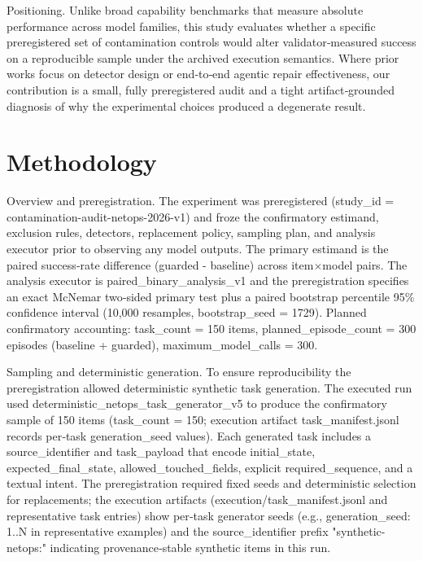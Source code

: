 \documentclass[conference]{IEEEtran}
\begin{document}
Positioning. Unlike broad capability benchmarks that measure absolute performance across model families, this study evaluates whether a specific preregistered set of contamination controls would alter validator‑measured success on a reproducible sample under the archived execution semantics. Where prior works focus on detector design or end‑to‑end agentic repair effectiveness, our contribution is a small, fully preregistered audit and a tight artifact‑grounded diagnosis of why the experimental choices produced a degenerate result.

\section{Methodology}
Overview and preregistration. The experiment was preregistered (study\_id = contamination-audit-netops-2026-v1) and froze the confirmatory estimand, exclusion rules, detectors, replacement policy, sampling plan, and analysis executor prior to observing any model outputs. The primary estimand is the paired success‑rate difference (guarded - baseline) across item\ensuremath{\times}model pairs. The analysis executor is paired\_binary\_analysis\_v1 and the preregistration specifies an exact McNemar two‑sided primary test plus a paired bootstrap percentile 95\% confidence interval (10,000 resamples, bootstrap\_seed = 1729). Planned confirmatory accounting: task\_count = 150 items, planned\_episode\_count = 300 episodes (baseline + guarded), maximum\_model\_calls = 300.

Sampling and deterministic generation. To ensure reproducibility the preregistration allowed deterministic synthetic task generation. The executed run used deterministic\_netops\_task\_generator\_v5 to produce the confirmatory sample of 150 items (task\_count = 150; execution artifact task\_manifest.jsonl records per‑task generation\_seed values). Each generated task includes a source\_identifier and task\_payload that encode initial\_state, expected\_final\_state, allowed\_touched\_fields, explicit required\_sequence, and a textual intent. The preregistration required fixed seeds and deterministic selection for replacements; the execution artifacts (execution/task\_manifest.jsonl and representative task entries) show per‑task generator seeds (e.g., generation\_seed: 1..N in representative examples) and the source\_identifier prefix "synthetic-netops:" indicating provenance‑stable synthetic items in this run.
\end{document}
